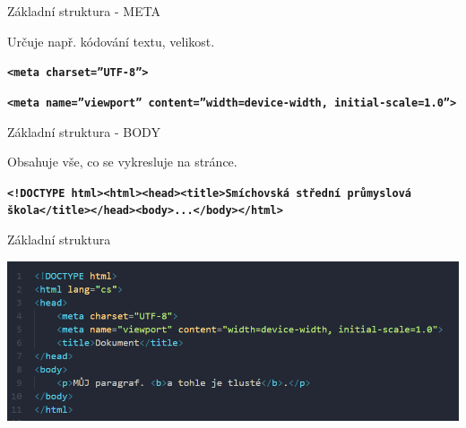 \documentclass[aspectratio=169]{beamer}
\begin{document}
\begin{frame}{Základní struktura - META}
    \begin{cardTiny}
        \begin{flushleft}
        Určuje např. kódování textu, velikost.
        \end{flushleft}
    \end{cardTiny}
    \begin{cardTiny}
        \begin{flushleft}
        \texttt{\textbf{<meta charset=''UTF-8''>}}
        
        \texttt{\textbf{<meta name=''viewport'' content=''width=device-width, initial-scale=1.0''>}}
        \end{flushleft}
    \end{cardTiny}
\end{frame}

\begin{frame}{Základní struktura - BODY}
    \begin{cardTiny}
        \begin{flushleft}
            Obsahuje vše, co se vykresluje na stránce.
        \end{flushleft}
    \end{cardTiny}
    \begin{cardTiny}
        \begin{flushleft}
        \texttt{\textbf{<!DOCTYPE html><html><head><title>Smíchovská střední průmyslová škola</title></head><body>...</body></html>}}
        \end{flushleft}
    \end{cardTiny}
\end{frame}

\begin{frame}{Základní struktura}
    \begin{center}
        \includegraphics[width=\textwidth]{img/html-6.png}
    \end{center}
\end{frame}
\end{document}
